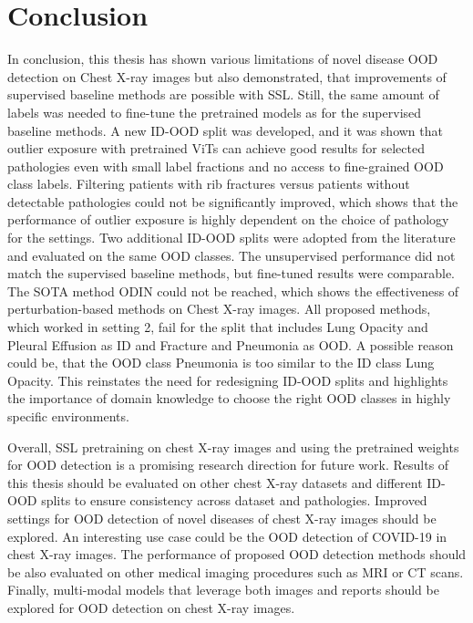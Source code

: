 \section{Conclusion}
In conclusion, this thesis has shown various limitations of novel disease OOD detection on Chest X-ray images but also demonstrated, that improvements of supervised baseline methods are possible with SSL. 
Still, the same amount of labels was needed to fine-tune the pretrained models as for the supervised baseline methods.
A new ID-OOD split was developed, and it was shown that outlier exposure with pretrained ViTs can achieve good results for selected pathologies even with small label fractions and no access to fine-grained OOD class labels.
Filtering patients with rib fractures versus patients without detectable pathologies could not be significantly improved, which shows that the performance of outlier exposure is highly dependent on the choice of pathology for the settings.
Two additional ID-OOD splits were adopted from the literature and evaluated on the same OOD classes.
The unsupervised performance did not match the supervised baseline methods, but fine-tuned results were comparable.
The SOTA method ODIN could not be reached, which shows the effectiveness of perturbation-based methods on Chest X-ray images.
All proposed methods, which worked in setting 2, fail for the split that includes Lung Opacity and Pleural Effusion as ID and Fracture and Pneumonia as OOD.
A possible reason could be, that the OOD class Pneumonia is too similar to the ID class Lung Opacity.
This reinstates the need for redesigning ID-OOD splits and highlights the importance of domain knowledge to choose the right OOD classes in highly specific environments.
\par 
Overall, SSL pretraining on chest X-ray images and using the pretrained weights for OOD detection is a promising research direction for future work.
Results of this thesis should be evaluated on other chest X-ray datasets and different ID-OOD splits to ensure consistency across dataset and pathologies.
Improved settings for OOD detection of novel diseases of chest X-ray images should be explored.
An interesting use case could be the OOD detection of COVID-19 in chest X-ray images.
The performance of proposed OOD detection methods should be also evaluated on other medical imaging procedures such as MRI or CT scans.
Finally, multi-modal models that leverage both images and reports should be explored for OOD detection on chest X-ray images.
